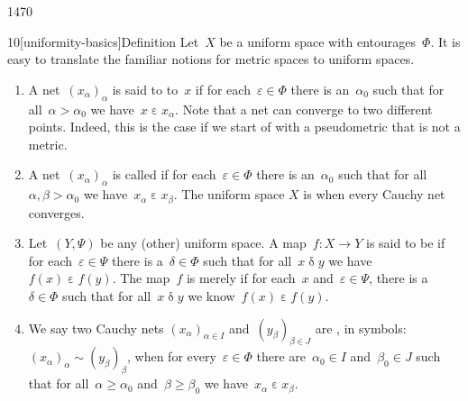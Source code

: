 \begin{parsec}{1470}%
\begin{point}{10}[uniformity-basics]{Definition}%
Let~$X$ be a uniform space with entourages~$\Phi$.
It is easy to translate the familiar notions for
    metric spaces to uniform spaces.
\begin{enumerate}
    \item A net~$(x_\alpha)_\alpha$ is said to
         to~$x$
            if for each~$\varepsilon \in \Phi$
            there is an~$\alpha_0$
            such that for all~$\alpha > \alpha_0$
                we have~$x \mathrel\varepsilon x_\alpha$.
Note that a net can converge to two different points.
Indeed, this is the case if we start of with a pseudometric
    that is not a metric.
\item A net~$(x_\alpha)_\alpha$ is called 
        if for each~$\varepsilon \in \Phi$
            there is an~$\alpha_0$
            such that for all~$\alpha,\beta > \alpha_0$
            we have~$x_\alpha \mathrel\varepsilon x_\beta$.
            The uniform space $X$ is 
    when every Cauchy net converges.
\item
Let~$(Y,\Psi)$ be any (other) uniform space.
A map~$f\colon X \to Y$
is said to be 
if for each~$\varepsilon \in \Psi$
there is a~$\delta \in \Phi$
such that for all~$x \mathrel\delta y$
we have~$f(x) \mathrel\varepsilon f(y)$.
The map~$f$ is merely 
if for each~$x$ and~$\varepsilon\in\Psi$,
there is a~$\delta \in \Phi$
such that for all~$x \mathrel{\delta} y$
we know~$f(x) \mathrel\varepsilon f(y)$.
\item
We say two Cauchy nets
$(x_\alpha)_{\alpha\in I}$
and~$(y_\beta)_{\beta\in J}$ are ,
in symbols: $(x_\alpha)_\alpha \sim (y_\beta)_\beta$,
when for every~$\varepsilon \in \Phi$
there are~$\alpha_0 \in I$ and~$\beta_0 \in J$
such that for all~$\alpha \geq \alpha_0$ and~$\beta \geq \beta_0$
we have~$x_\alpha \mathrel\varepsilon x_\beta$.


\end{enumerate}
\end{point}
\end{parsec}
